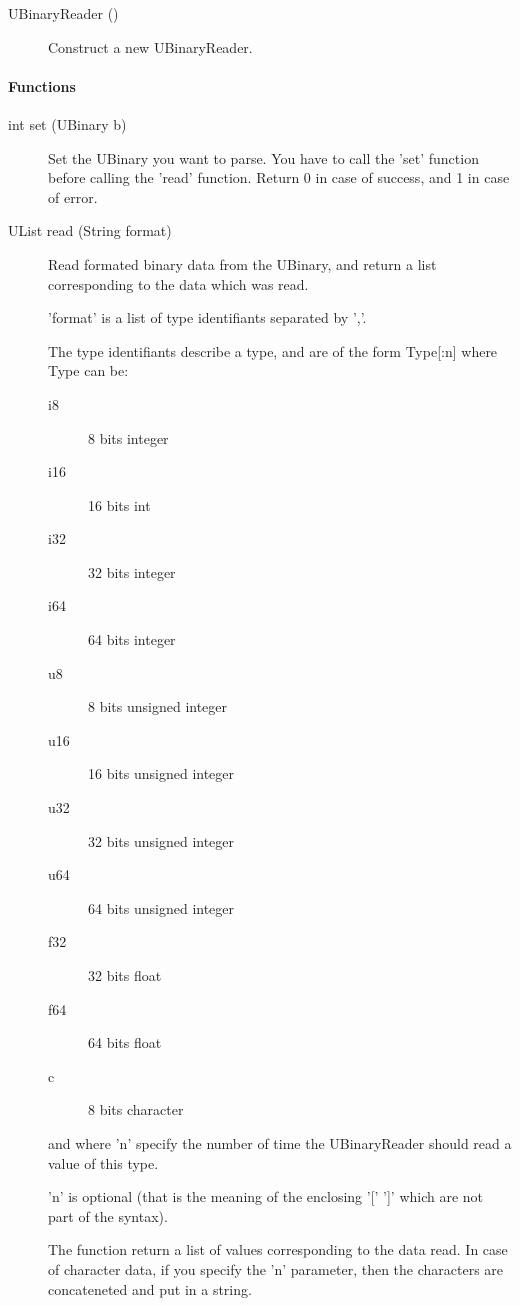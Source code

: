 \noindent
\begin{description}
\item[{UBinaryReader ()}]         Construct a new UBinaryReader.

\end{description}

\paragraph{Functions}
\label{webots.uobjects.other.ubinaryreader.functions}%

\noindent
\begin{description}
\item[{int set (UBinary b)}] Set the UBinary you want to parse. You
  have to call the 'set' function before calling the 'read' function.
  Return 0 in case of success, and 1 in case of error.

\item[{UList read (String format)}] Read formated binary data from the
  UBinary, and return a list corresponding to the data which was read.


  'format' is a list of type identifiants separated by ','.


  The type identifiants describe a type, and are of the form Type[:n]
  where Type can be:
  \begin{description}
  \item[i8] 8 bits integer
  \item[i16] 16 bits int
  \item[i32] 32 bits integer
  \item[i64] 64 bits integer
  \item[u8] 8 bits unsigned integer
  \item[u16] 16 bits unsigned integer
  \item[u32] 32 bits unsigned integer
  \item[u64] 64 bits unsigned integer
  \item[f32] 32 bits float
  \item[f64] 64 bits float
  \item[c] 8 bits character
  \end{description}
  and where 'n' specify the number of time the UBinaryReader should
  read a value of this type.


  'n' is optional (that is the meaning of the enclosing '[' ']' which
  are not part of the syntax).


  The function return a list of values corresponding to the data read.
  In case of character data, if you specify the 'n' parameter, then
  the characters are concateneted and put in a string.



\end{description}
